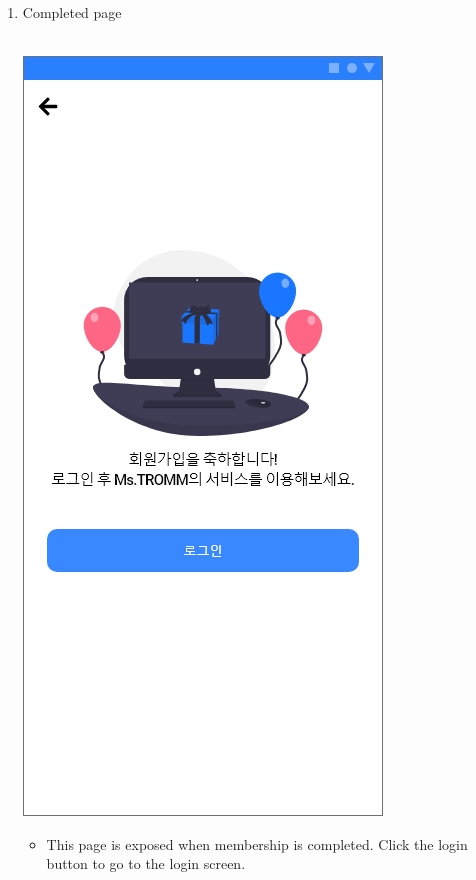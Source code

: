 \documentclass[conference]{IEEEtran}
\begin{document}
\begin{enumerate}
\begin{itemize}
    \end{itemize}
    \item Completed page \\ \\
    \centerline{\includegraphics[scale=0.32]{assets/회원가입5.jpg}}
        \begin{itemize}
        \item[] This page is exposed when membership is completed. Click the login button to go to the login screen.
    \end{itemize}
    \end{enumerate}
\end{document}
